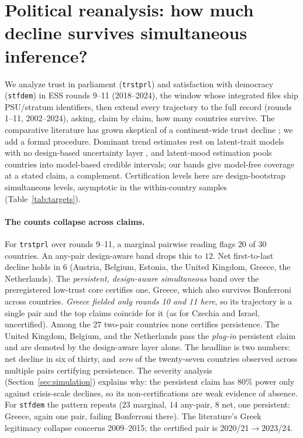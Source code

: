 \section{Political reanalysis: how much decline survives simultaneous inference?}\label{sec:political}

We analyze trust in parliament (\texttt{trstprl}) and satisfaction with
democracy (\texttt{stfdem}) in ESS rounds 9--11 (2018--2024), the window whose
integrated files ship PSU/stratum identifiers, then extend every trajectory
to the full record (rounds 1--11, 2002--2024), asking, claim by claim, how
many countries survive. The comparative literature has grown
skeptical of a continent-wide trust decline
\citep{norris2017western,voeten2017people,wuttke2022europeans}; we add a
formal procedure. Dominant trend estimates \citep{valgardsson2025crisis} rest
on latent-trait models with no design-based uncertainty layer
\citep{taihusolt2024}, and latent-mood estimation
\citep{claassen2019estimating,claassen2020support,kolczynska2026trust} pools
countries into model-based credible intervals; our bands give model-free
coverage at a stated claim, a complement.
Certification levels here are design-bootstrap simultaneous levels, asymptotic in the within-country samples (Table~\ref{tab:targets}).

\paragraph{The counts collapse across claims.} For \texttt{trstprl} over
rounds 9--11, a marginal pairwise reading flags $20$ of $30$ countries. An
any-pair design-aware band drops this to $12$. Net first-to-last decline
holds in $6$ (Austria, Belgium, Estonia, the United Kingdom, Greece, the
Netherlands). The \emph{persistent, design-aware simultaneous} band over the
preregistered low-trust core certifies one, Greece, which also survives
Bonferroni across countries. \emph{Greece fielded only rounds 10 and 11 here}, so its trajectory is a
single pair and the top claims coincide for it (as for Czechia and Israel,
uncertified). Among the $27$ two-pair countries none certifies persistence. The United Kingdom, Belgium,
and the Netherlands pass the \emph{plug-in} persistent claim and are demoted
by the design-aware layer alone. The headline is two numbers: net
decline in six of thirty, and \emph{zero} of the twenty-seven countries
observed across multiple pairs certifying persistence. The severity
analysis (Section~\ref{sec:simulation}) explains why: the persistent claim
has $80\%$ power only against crisis-scale declines, so its
non-certifications are weak evidence of absence. For \texttt{stfdem} the
pattern repeats ($23$ marginal, $14$ any-pair, $8$ net, one persistent:
Greece, again one pair, failing Bonferroni there). The literature's Greek
legitimacy collapse \citep{armingeon2014democracy,torcal2014decline}
concerns 2009--2015; the certified pair is 2020/21$\to$2023/24.

